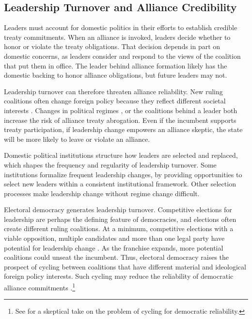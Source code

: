 \documentclass[12pt]{article}
\begin{document}
\subsection{Leadership Turnover and Alliance Credibility}


Leaders must account for domestic politics in their efforts to establish credible treaty commitments.
When an alliance is invoked, leaders decide whether to honor or violate the treaty obligations. 
That decision depends in part on domestic concerns, as leaders consider and respond to the views of the coalition that put them in office. 
The leader behind alliance formation likely has the domestic backing to honor alliance obligations, but future leaders may not. 


Leadership turnover can therefore threaten alliance reliability.
New ruling coalitions often change foreign policy because they reflect different societal interests \citep{Lobell2004, Narizny2007, Mattesetal2016}.  
Changes in political regimes \citep{LeedsSavun2007}, or the coalitions behind a leader \citep{Leedsetal2009} both increase the risk of alliance treaty abrogation. 
Even if the incumbent supports treaty participation, if leadership change empowers an alliance skeptic, the state will be more likely to leave or violate an alliance.  


Domestic political institutions structure how leaders are selected and replaced, which shapes the frequency and regularity of leadership turnover. 
Some institutions formalize frequent leadership changes, by providing opportunities to select new leaders within a consistent institutional framework. 
Other selection processes make leadership change without regime change difficult. 


Electoral democracy generates leadership turnover. 
Competitive elections for leadership are perhaps the defining feature of democracies, and elections often create different ruling coalitions. 
At a minimum, competitive elections with a viable opposition, multiple candidates and more than one legal party have potential for leadership change \citep{HydeMarinov2012}. 
As the franchise expands, more potential coalitions could unseat the incumbent.  
Thus, electoral democracy raises the prospect of cycling between coalitions that have different material and ideological foreign policy interests. 
Such cycling may reduce the reliability of democratic alliance commitments \citep{GartzkeGleditsch2004}.\footnote{See \citet{Gaubatz1996} for a skeptical take on the problem of cycling for democratic reliability.}
\end{document}
